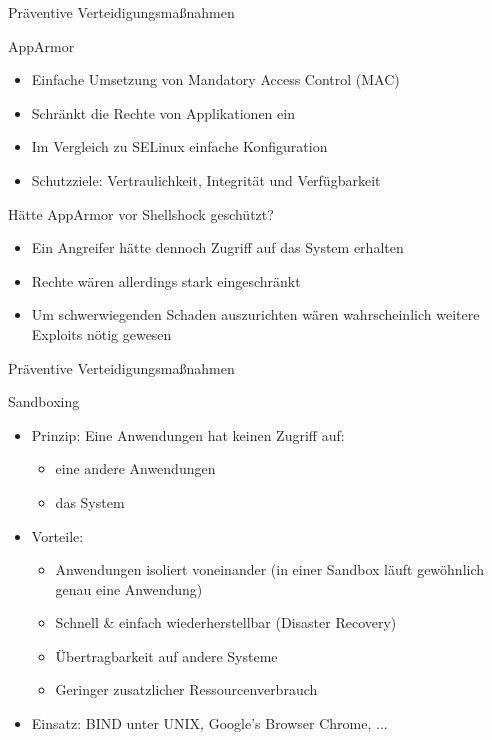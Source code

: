 \begin{frame}{Präventive Verteidigungsmaßnahmen}
  \begin{block}{AppArmor}
    \begin{itemize}[<+->]
      \item Einfache Umsetzung von Mandatory Access Control (MAC)
      \item Schränkt die Rechte von Applikationen ein
      \item Im Vergleich zu SELinux einfache Konfiguration
      \item Schutzziele: Vertraulichkeit, Integrität und Verfügbarkeit
    \end{itemize}
  \end{block}

  \begin{block}{Hätte AppArmor vor Shellshock geschützt?}
    \begin{itemize}[<+->]
      \item Ein Angreifer hätte dennoch Zugriff auf das System erhalten
      \item Rechte wären allerdings stark eingeschränkt
      \item Um schwerwiegenden Schaden auszurichten wären wahrscheinlich weitere Exploits nötig gewesen
    \end{itemize}
  \end{block}
\end{frame}

\begin{frame}{Präventive Verteidigungsmaßnahmen}
  \begin{block}{Sandboxing}
    \begin{itemize}[<+->]
      \item Prinzip: Eine Anwendungen hat keinen Zugriff auf:
      \begin{itemize}[<+->]
        \item eine andere Anwendungen
        \item das System
      \end{itemize}
      \item Vorteile:
      \begin{itemize}[<+->]
        \item Anwendungen isoliert voneinander (in einer Sandbox läuft gewöhnlich genau eine Anwendung)
        \item Schnell \& einfach wiederherstellbar (Disaster Recovery)
        \item Übertragbarkeit auf andere Systeme
        \item Geringer zusatzlicher Ressourcenverbrauch
      \end{itemize}
      \item Einsatz: BIND unter UNIX, Google's Browser Chrome, ...
    \end{itemize}
  \end{block}
\end{frame}

